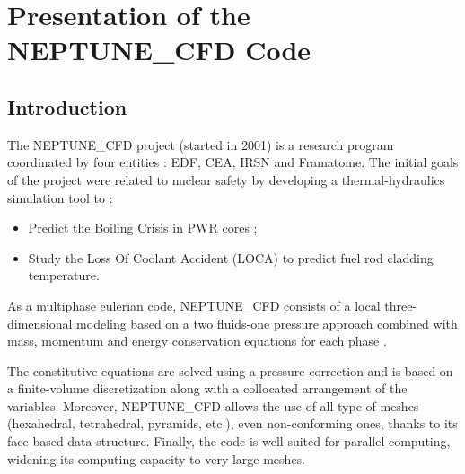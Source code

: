
\chapter{Presentation of the NEPTUNE\_CFD Code} %

\label{chap:ncfd} %


\minitoc


\section{Introduction}

The NEPTUNE\_CFD project (started in 2001) is a research program coordinated by four entities : EDF, CEA, IRSN and Framatome. The initial goals of the project were related to nuclear safety by developing a thermal-hydraulics simulation tool to :

\begin{itemize}
\item Predict the Boiling Crisis in PWR cores ;
\item Study the Loss Of Coolant Accident (LOCA) to predict fuel rod cladding temperature.
\end{itemize}

As a multiphase eulerian code, NEPTUNE\_CFD consists of a local three-dimensional  modeling based on a two fluids-one pressure approach combined with mass, momentum and energy conservation equations for each phase \cite{guelfi_neptune_2007}. 


\npar
The constitutive equations are solved using a pressure correction and is based on a finite-volume discretization along with a collocated arrangement of the variables. Moreover, NEPTUNE\_CFD allows the use of all type of meshes (hexahedral, tetrahedral, pyramids, etc.), even non-conforming ones, thanks to its face-based data structure. Finally, the code is well-suited for parallel computing, widening its computing capacity to very large meshes.

